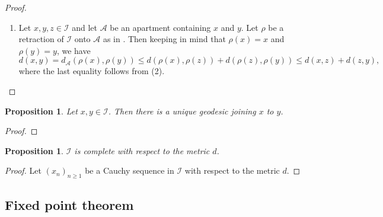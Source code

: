 \documentclass{article}
\theoremstyle{thmstyle}
\newtheorem{proposition}[theorem]{Proposition}
\theoremstyle{defstyle}
\newcommand{\scrA}{\mathscr{A}}
\newcommand{\scrI}{\mathscr{I}}
\renewcommand{\le}{\leqslant}
\renewcommand{\ge}{\geqslant}
\begin{document}
\begin{proof}
\begin{enumerate}[label=(\arabic*)]
\item Let $x, y, z\in\scrI$ and let $\scrA$ be an apartment containing $x$ and $y$. Let $\rho$ be a retraction of $\scrI$ onto $\scrA$ as in . Then keeping in mind that $\rho(x) = x$ and $\rho(y) = y$, we have 
\begin{equation*}
    d(x, y) = d_{\scrA}(\rho(x), \rho(y))\le d(\rho(x), \rho(z)) + d(\rho(z), \rho(y))\le d(x, z) + d(z, y),
\end{equation*}
where the last equality follows from (2). \qedhere
\end{enumerate}
\end{proof}

\begin{proposition}
    Let $x, y\in\scrI$. Then there is a unique geodesic joining $x$ to $y$.
\end{proposition}
\begin{proof}
\end{proof}

\begin{proposition}
    $\scrI$ is complete with respect to the metric $d$.
\end{proposition}
\begin{proof}
    Let $(x_n)_{n\ge 1}$ be a Cauchy sequence in $\scrI$ with respect to the metric $d$.
\end{proof}

\subsection*{Fixed point theorem}



\end{document}
